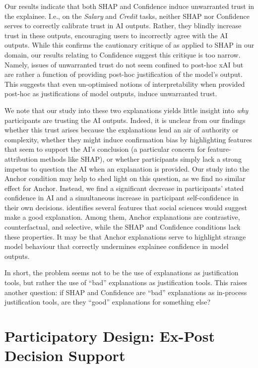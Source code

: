 Our results indicate that both SHAP and Confidence induce unwarranted trust in the explainee. I.e., on the \emph{Salary} and \emph{Credit} tasks, neither SHAP nor Confidence serves to correctly calibrate trust in AI outputs. Rather, they blindly increase trust in these outputs, encouraging users to incorrectly agree with the AI outputs. While this confirms the cautionary critique of \textcite{Lipton} as applied to SHAP in our domain, our results relating to Confidence suggest this critique is too narrow. Namely, issues of unwarranted trust do not seem confined to post-hoc xAI but are rather a function of providing post-hoc justification of the model's output. This suggests that even un-optimised notions of interpretability when provided post-hoc as justifications of model outputs, induce unwarranted trust.

We note that our study into these two explanations yields little insight into \emph{why} participants are trusting the AI outputs. Indeed, it is unclear from our findings whether this trust arises because the explanations lend an air of authority or complexity, whether they might induce confirmation bias by highlighting features that seem to support the AI's conclusion (a particular concern for feature-attribution methods like SHAP), or whether participants simply lack a strong impetus to question the AI when an explanation is provided. Our study into the Anchor condition may help to shed light on this question, as we find no similar effect for Anchor. Instead, we find a significant decrease in participants' stated confidence in AI and a simultaneous increase in participant self-confidence in their own decisions. \textcite{miller_explanation_2017} identifies several features that social sciences would suggest make a good explanation. Among them, Anchor explanations are contrastive, counterfactual, and selective, while the SHAP and Confidence conditions lack these properties. It may be that Anchor explanations serve to highlight strange model behaviour that correctly undermines explainee confidence in model outputs. 

In short, the problem seems not to be the use of explanations as justification tools, but rather the use of ``bad'' explanations as justification tools. This raises another question: if SHAP and Confidence are ``bad'' explanations as in-process justification tools, are they ``good'' explanations for something else?

\section[Participatory Design]{Participatory Design: Ex-Post Decision Support}\label{sec:xaicase}

